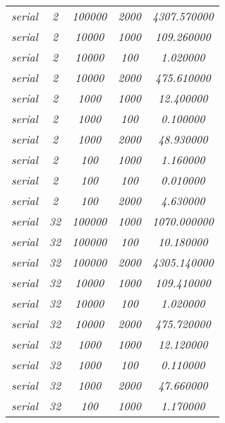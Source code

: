 \documentclass[../main.tex]{subfiles}
\begin{document}
\begin{table}[]
\begin{tabular}{|c|c|c|c|c|}
\textit{serial}  & \textit{2}       & \textit{100000} & \textit{2000} & \textit{4307.570000} \\
\textit{serial}  & \textit{2}       & \textit{10000}  & \textit{1000} & \textit{109.260000}  \\
\textit{serial}  & \textit{2}       & \textit{10000}  & \textit{100}  & \textit{1.020000}    \\
\textit{serial}  & \textit{2}       & \textit{10000}  & \textit{2000} & \textit{475.610000}  \\
\textit{serial}  & \textit{2}       & \textit{1000}   & \textit{1000} & \textit{12.400000}   \\
\textit{serial}  & \textit{2}       & \textit{1000}   & \textit{100}  & \textit{0.100000}    \\
\textit{serial}  & \textit{2}       & \textit{1000}   & \textit{2000} & \textit{48.930000}   \\
\textit{serial}  & \textit{2}       & \textit{100}    & \textit{1000} & \textit{1.160000}    \\
\textit{serial}  & \textit{2}       & \textit{100}    & \textit{100}  & \textit{0.010000}    \\
\textit{serial}  & \textit{2}       & \textit{100}    & \textit{2000} & \textit{4.630000}    \\
\textit{serial}  & \textit{32}      & \textit{100000} & \textit{1000} & \textit{1070.000000} \\
\textit{serial}  & \textit{32}      & \textit{100000} & \textit{100}  & \textit{10.180000}   \\
\textit{serial}  & \textit{32}      & \textit{100000} & \textit{2000} & \textit{4305.140000} \\
\textit{serial}  & \textit{32}      & \textit{10000}  & \textit{1000} & \textit{109.410000}  \\
\textit{serial}  & \textit{32}      & \textit{10000}  & \textit{100}  & \textit{1.020000}    \\
\textit{serial}  & \textit{32}      & \textit{10000}  & \textit{2000} & \textit{475.720000}  \\
\textit{serial}  & \textit{32}      & \textit{1000}   & \textit{1000} & \textit{12.120000}   \\
\textit{serial}  & \textit{32}      & \textit{1000}   & \textit{100}  & \textit{0.110000}    \\
\textit{serial}  & \textit{32}      & \textit{1000}   & \textit{2000} & \textit{47.660000}   \\
\textit{serial}  & \textit{32}      & \textit{100}    & \textit{1000} & \textit{1.170000}    \\

\end{tabular}
\end{table}
\end{document}
